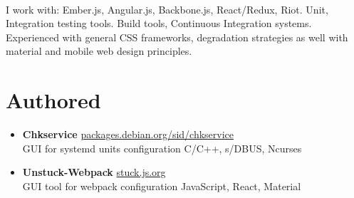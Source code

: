 \documentclass[a4paper,11pt]{article}
\begin{document}
{\paragraph{}I work with: Ember.js, Angular.js, Backbone.js, React/Redux, Riot. Unit, Integration testing tools. Build tools, Continuous Integration systems. Experienced with general CSS frameworks, degradation strategies as well with material and mobile web design principles.
%
%
%
%
\section*{Authored}

\begin{itemize}[itemsep=4pt,label=]
  \item \textbf{Chkservice} \href{https://packages.debian.org/sid/chkservice}{packages.debian.org/sid/chkservice}\\
    GUI for systemd units configuration  \hfill  C/C++, s/DBUS, Ncurses

  \item \textbf{Unstuck-Webpack} \href{https://stuck.js.org}{stuck.js.org}\\
    GUI tool for webpack configuration \hfill  JavaScript, React, Material


\end{itemize}}
\end{document}
